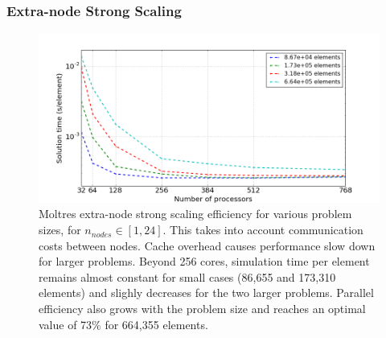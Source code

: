 \begin{frame}
        \frametitle{Extra-node Strong Scaling}
        \vspace*{-0.2in}
\begin{figure}[htpb]
  \centering
  \includegraphics[width=\textwidth]{./images/extra-node_strong.png}
  \caption{Moltres extra-node strong scaling efficiency for various problem 
        sizes, for $n_{nodes} \in [1,24]$.  This takes into account 
        communication costs between nodes. Cache overhead causes performance 
        slow down for larger problems. Beyond 256 cores, simulation time per 
        element remains almost constant for small cases (86,655 and 173,310 
        elements) and slighly decreases for the two larger problems. Parallel 
        efficiency also grows with the problem size and reaches an optimal 
        value of 73\% for 664,355 elements.  }
  \label{fig:extra_strong_scaling}
\end{figure}

\end{frame}


